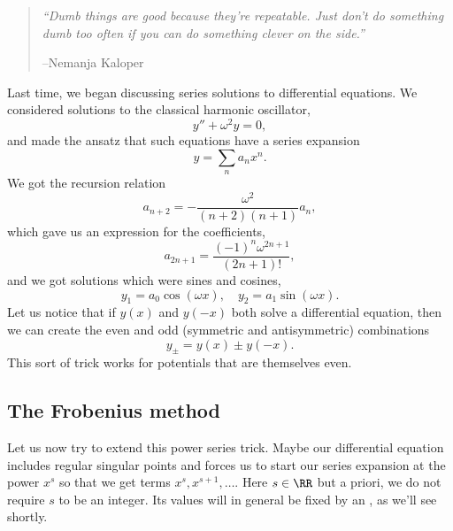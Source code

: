 \begin{quote}
    \textit{``Dumb things are good because they're repeatable. Just don't do something dumb too often if you can do something clever on the side.''}
    
    --Nemanja Kaloper
\end{quote}

Last time, we began discussing series solutions to differential equations.
We considered solutions to the classical harmonic oscillator,
\begin{equation}
    y'' + \omega^2 y = 0,
\end{equation}
and made the ansatz that such equations have a series expansion
\begin{equation}
    y= \sum_n a_n x^n.
\end{equation}
We got the recursion relation
\begin{equation}
     a_{n+2} = -\frac{\omega^2}{(n+2)(n+1)}a_n,
\end{equation}
which gave us an expression for the coefficients,
\begin{equation}
    a_{2n+1} = \frac{(-1)^n \omega^{2n+1}}{(2n+1)!},
\end{equation}
and we got solutions which were sines and cosines,
\begin{equation}
    y_1 = a_0 \cos(\omega x), \quad y_2 = a_1 \sin(\omega x).
\end{equation}
Let us notice that if $y(x)$ and $y(-x)$ both solve a differential equation, then we can create the even and odd (symmetric and antisymmetric) combinations
\begin{equation}
    y_\pm = y(x) \pm y(-x).
\end{equation}
This sort of trick works for potentials that are themselves even.

\subsection*{The Frobenius method}
Let us now try to extend this power series trick. Maybe our differential equation includes regular singular points and forces us to start our series expansion at the power $x^s$ so that we get terms $x^s, x^{s+1},\ldots$. Here $s\in\RR$ but a priori, we do not require $s$ to be an integer. Its values will in general be fixed by an , as we'll see shortly.


